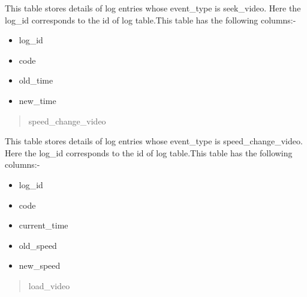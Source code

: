 \documentclass[a4paper,12pt,oneside]{sphinxmanual}
\begin{document}
\begin{DUlineblock}{0em}
\item[] This table stores details of log entries whose event\_type is seek\_video.  Here the log\_id                 corresponds  to the id of log table.This table has the following columns:-
\end{DUlineblock}
\begin{itemize}
\item {} 
log\_id

\item {} 
code

\item {} 
old\_time

\item {} 
new\_time

\end{itemize}
\begin{quote}\begin{description}
\item[{speed\_change\_video}] \leavevmode
\end{description}\end{quote}

\begin{DUlineblock}{0em}
\item[] This table stores details of log entries whose event\_type is speed\_change\_video.  Here the log\_id   corresponds  to the id of log table.This table has the following columns:-
\end{DUlineblock}
\begin{itemize}
\item {} 
log\_id

\item {} 
code

\item {} 
current\_time

\item {} 
old\_speed

\item {} 
new\_speed

\end{itemize}
\begin{quote}\begin{description}
\item[{load\_video}] \leavevmode
\end{description}\end{quote}
\end{document}
